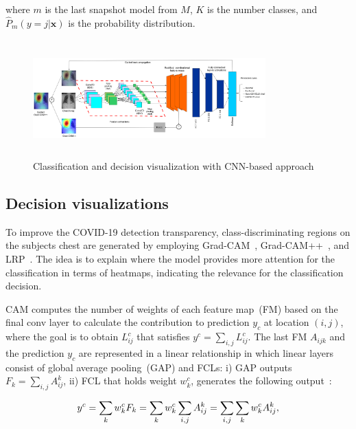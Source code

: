 \documentclass[conference]{IEEEtran}
\begin{document}
where $m$ is the last snapshot model from $M$, $K$ is the number classes, and $\hat{P}_{m}(y=j | \mathbf{x})$ is the probability distribution. 

\begin{figure}
	\centering
	\includegraphics[width=0.8\textwidth,height=45mm]{gcam_wf.png}
    \caption{Classification and decision visualization with CNN-based approach}	
	\label{fig:viz}
	\vspace{-2mm}
\end{figure}

\subsection{Decision visualizations}
To improve the COVID-19 detection transparency, class-discriminating regions on the subjects chest are generated by employing Grad-CAM~\cite{114}, Grad-CAM++~\cite{chattopadhay2018grad}, and LRP~\cite{LRP2}. The idea is to explain where the model provides more attention for the classification in terms of heatmaps, 
indicating the relevance for the classification decision.

\iffalse
CAM computes the number of weights of each feature map~(FM) based on the final conv layer to calculate the contribution to prediction $y_c$ at location $(i,j)$, where the goal is to obtain $L_{ij}^{c}$ that satisfies $y^{c}=\sum_{i, j} L_{ij}^{c}$. The last FM $A_{ijk}$ and the prediction $y_c$ are represented in a linear relationship in which linear layers consist of global average pooling~(GAP) and FCLs: i) GAP outputs $F_{k}=\sum_{i,j} A^k_{ij}$, ii) FCL that holds weight $w_{k}^{c}$, generates the following output~\cite{kim2020extending}: 
 
 \begin{equation}
 \scriptsize{
     y^{c}=\sum_{k} w_{k}^{c} F_{k}=\sum_{k} w_{k}^{c} \sum_{i,j} A^k_{ij}=\sum_{i, j} \sum_{k} w_{k}^{c} A^k_{ij},}
 \end{equation}
 
\end{document}
